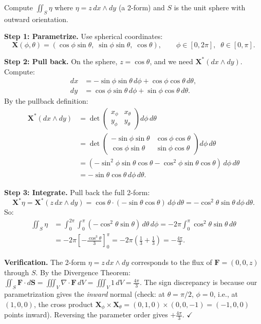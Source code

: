 \documentclass[11pt]{report}
\begin{document}
\begin{example}
Compute $\iint_S \eta$ where $\eta = z\,dx \wedge dy$ (a 2-form) and $S$ is the unit sphere with outward orientation.

\textbf{Step 1: Parametrize.} Use spherical coordinates:
\[
\mathbf{X}(\phi, \theta) = (\cos\phi\sin\theta, \;\sin\phi\sin\theta, \;\cos\theta), \qquad \phi \in [0, 2\pi], \;\; \theta \in [0, \pi].
\]

\textbf{Step 2: Pull back.} On the sphere, $z = \cos\theta$, and we need $\mathbf{X}^*(dx \wedge dy)$. Compute:
\begin{align*}
dx &= -\sin\phi\sin\theta\,d\phi + \cos\phi\cos\theta\,d\theta, \\
dy &= \cos\phi\sin\theta\,d\phi + \sin\phi\cos\theta\,d\theta.
\end{align*}
By the pullback definition:
\begin{align*}
\mathbf{X}^*(dx \wedge dy) &= \det \begin{pmatrix} x_\phi & x_\theta \\ y_\phi & y_\theta \end{pmatrix} d\phi\,d\theta \\
&= \det \begin{pmatrix} -\sin\phi\sin\theta & \cos\phi\cos\theta \\ \cos\phi\sin\theta & \sin\phi\cos\theta \end{pmatrix} d\phi\,d\theta \\
&= (-\sin^2\phi\sin\theta\cos\theta - \cos^2\phi\sin\theta\cos\theta)\,d\phi\,d\theta \\
&= -\sin\theta\cos\theta\,d\phi\,d\theta.
\end{align*}

\textbf{Step 3: Integrate.} Pull back the full 2-form:
\[
\mathbf{X}^*\eta = \mathbf{X}^*(z\,dx \wedge dy) = \cos\theta \cdot (-\sin\theta\cos\theta)\,d\phi\,d\theta = -\cos^2\theta\sin\theta\,d\phi\,d\theta.
\]
So:
\begin{align*}
\iint_S \eta &= \int_0^{2\pi}\int_0^{\pi} (-\cos^2\theta\sin\theta)\,d\theta\,d\phi = -2\pi \int_0^{\pi} \cos^2\theta\sin\theta\,d\theta \\
&= -2\pi \left[-\frac{\cos^3\theta}{3}\right]_0^{\pi} = -2\pi\left(\frac{1}{3} + \frac{1}{3}\right) = -\frac{4\pi}{3}.
\end{align*}

\textbf{Verification.} The 2-form $\eta = z\,dx \wedge dy$ corresponds to the flux of $\mathbf{F} = (0, 0, z)$ through $S$. By the Divergence Theorem: $\iint_S \mathbf{F} \cdot d\mathbf{S} = \iiint_V \nabla \cdot \mathbf{F}\,dV = \iiint_V 1\,dV = \frac{4\pi}{3}$. The sign discrepancy is because our parametrization gives the \textit{inward} normal (check: at $\theta = \pi/2$, $\phi = 0$, i.e., at $(1, 0, 0)$, the cross product $\mathbf{X}_\phi \times \mathbf{X}_\theta = (0, 1, 0) \times (0, 0, -1) = (-1, 0, 0)$ points inward). Reversing the parameter order gives $+\frac{4\pi}{3}$. $\checkmark$
\end{example}
\end{document}
